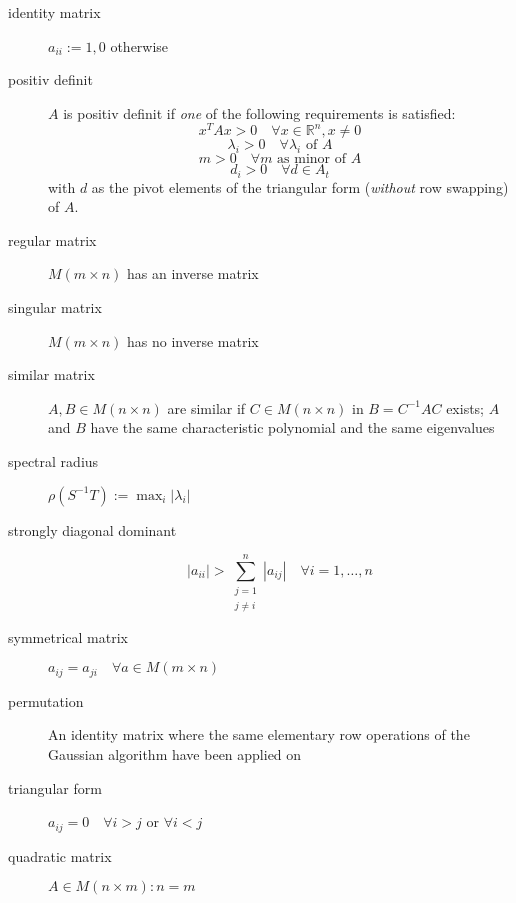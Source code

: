 \documentclass[a4paper,twocolumn]{article}
\begin{document}
\begin{description}
  \item[identity matrix] $a_{ii} := 1, 0$ otherwise
  \item[positiv definit] $A$ is positiv definit if \emph{one} of
    the following requirements is satisfied:
    \begin{equation}
        x^T A x > 0 \quad \forall x \in \mathbb{R}^n, x\neq 0
    \end{equation} \begin{equation}
        \lambda_i > 0 \quad \forall \lambda_i \text{ of } A
    \end{equation} \begin{equation}
        m > 0 \quad \forall m \text{ as minor of } A
    \end{equation} \begin{equation}
        d_i > 0 \quad \forall d \in A_t
    \end{equation}
    with $d$ as the pivot elements of the triangular form
    (\emph{without} row swapping) of $A$.
  \item[regular matrix] $M(m\times n)$ has an inverse matrix
  \item[singular matrix] $M(m\times n)$ has no inverse matrix
  \item[similar matrix] $A, B \in M(n\times n)$ are similar
        if $C \in M(n\times n)$ in $B = C^{-1} AC$ exists;
        $A$ and $B$ have the same characteristic polynomial and
        the same eigenvalues
  \item[spectral radius] $\rho(S^{-1}T) := \max_i{|\lambda_i|}$
  \item[strongly diagonal dominant] \hfill{}
    \[
        |a_{ii}| > \sum_{\substack{j=1 \\ j\neq i}}^n
        |a_{ij}| \quad \forall i = 1,\ldots,n
    \]
  \item[symmetrical matrix]
    $a_{ij} = a_{ji} \quad\forall a \in M(m\times n)$
  \item[permutation] An identity matrix where the same
    elementary row operations of the Gaussian algorithm
    have been applied on
  \item[triangular form]
    $a_{ij} = 0 \quad\forall i > j$ or $\forall i < j$
  \item[quadratic matrix] $A \in M(n\times m): n = m$
\end{description}
\end{document}
